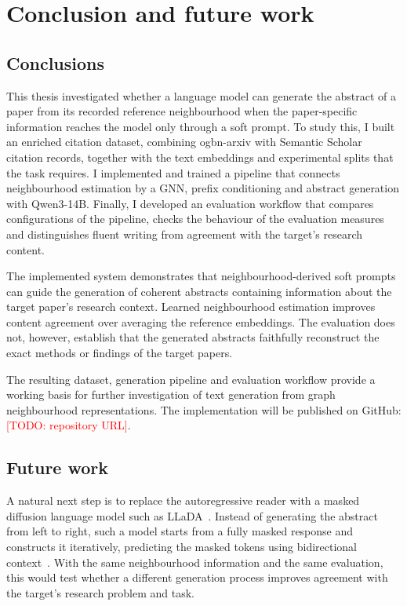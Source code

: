 \chapter{Conclusion and future work}
\label{chap:conclusion}

\section{Conclusions}
\label{sec:conclusion-summary}

This thesis investigated whether a language model can generate the abstract of a paper from its recorded reference neighbourhood when the paper-specific information reaches the model only through a soft prompt. To study this, I built an enriched citation dataset, combining ogbn-arxiv with Semantic Scholar citation records, together with the text embeddings and experimental splits that the task requires. I implemented and trained a pipeline that connects neighbourhood estimation by a GNN, prefix conditioning and abstract generation with Qwen3-14B. Finally, I developed an evaluation workflow that compares configurations of the pipeline, checks the behaviour of the evaluation measures and distinguishes fluent writing from agreement with the target's research content.

The implemented system demonstrates that neighbourhood-derived soft prompts can guide the generation of coherent abstracts containing information about the target paper's research context. Learned neighbourhood estimation improves content agreement over averaging the reference embeddings. The evaluation does not, however, establish that the generated abstracts faithfully reconstruct the exact methods or findings of the target papers.

The resulting dataset, generation pipeline and evaluation workflow provide a working basis for further investigation of text generation from graph neighbourhood representations. The implementation will be published on GitHub: \textcolor{red}{[TODO: repository URL]}.

\section{Future work}
\label{sec:future-work}

A natural next step is to replace the autoregressive reader with a masked diffusion language model such as LLaDA~\cite{nie2025llada}. Instead of generating the abstract from left to right, such a model starts from a fully masked response and constructs it iteratively, predicting the masked tokens using bidirectional context~\cite{nie2025llada}. With the same neighbourhood information and the same evaluation, this would test whether a different generation process improves agreement with the target's research problem and task.
